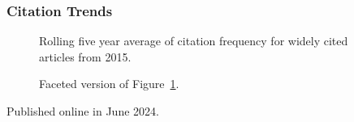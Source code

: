 \documentclass[
  10pt,
  letterpaper,
  DIV=11,
  numbers=noendperiod,
  twoside]{scrartcl}
\begin{document}
\subsubsection*{Citation Trends}\label{sec-trends-2015}

\begin{figure}


\caption{\label{fig-citation-spaghetti-2015}Rolling five year average of
citation frequency for widely cited articles from 2015.}

\end{figure}%

\begin{figure}


\caption{\label{fig-citation-facet-2015}Faceted version of
Figure~\ref{fig-citation-spaghetti-2015}.}

\end{figure}%

\newpage



\noindent Published online in June 2024.
\end{document}
